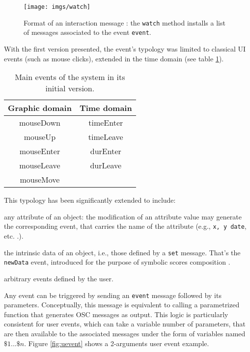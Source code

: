 \documentclass{article}
\newcommand{\OSC}[1]	{{\fontsize{8.5pt}{8pt} \selectfont\texttt{#1}}}
\let\olditemize\itemize
\let\oldenditemize\enditemize
\renewenvironment{itemize} 	{\olditemize \renewcommand{\labelitemi}{$\bullet$} \setlength{\itemsep}{0mm}}{\oldenditemize}
\begin{document}
\begin{figure}[htbp]
\centerline{
	\texttt{[image: imgs/watch]}}
\caption{Format of an interaction message : the \OSC{watch} method installs a list of messages associated to the event \OSC{event}.}
\label{fig:watch}
\end{figure}

With the first version presented, the event's typology was limited to classical UI events (such as mouse clicks), extended in the time domain (see table \ref{tbl:evts}). 

\begin{table}[htp]
\begin{center}
\begin{tabular}{c|c}
Graphic domain & Time domain \\
\hline
mouseDown 		& timeEnter	\\
mouseUp			& timeLeave	\\
mouseEnter		& durEnter		\\
mouseLeave		& durLeave		\\
mouseMove		&				\\
\end{tabular}
\end{center}
\caption{Main events of the system in its initial version.}
\label{tbl:evts}
\end{table}%

This typology has been significantly extended to include:
\begin{itemize}
\item any attribute of an object: the modification of an attribute value may generate the corresponding event, that carries the name of the attribute (e.g., \OSC{x, y date}, etc. .).
\item the intrinsic data of an object, i.e., those defined by a \OSC{set} message. That's the \OSC{newData} event, introduced for the purpose of symbolic scores composition \cite{Lepetit-Aimon_tenor2016}.
\item arbitrary events defined by the user.
\end{itemize}

Any event can be triggered by sending an \OSC{event} message followed by its parameters. Conceptually, this message  is equivalent to calling a 
parametrized function that generates OSC messages as output.
This logic is particularly consistent for user events, which can take a variable number of parameters, that are then available to the associated messages under the form of variables named $\$1 ... \$n$. Figure \ref{fig:uevent} shows a 2-arguments user event example.
\end{document}
